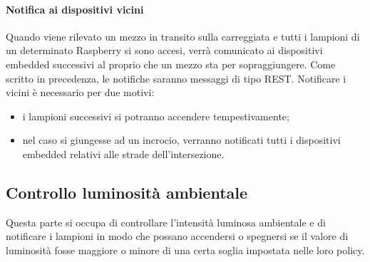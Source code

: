 \paragraph{Notifica ai dispositivi vicini}
Quando viene rilevato un mezzo in transito sulla carreggiata e tutti i lampioni di un determinato Raspberry si sono accesi, verrà comunicato ai dispositivi embedded successivi al proprio che un mezzo sta per sopraggiungere.
Come scritto in precedenza, le notifiche saranno messaggi di tipo REST.
Notificare i vicini è necessario per due motivi:
\begin{itemize}
	\item i lampioni successivi si potranno accendere tempestivamente;
	\item nel caso si giungesse ad un incrocio, verranno notificati tutti i dispositivi embedded relativi alle strade dell'intersezione.
\end{itemize}

\subsection{Controllo luminosità ambientale}
Questa parte si occupa di controllare l'intensità luminosa ambientale e di notificare i lampioni in modo che possano accendersi o spegnersi se il valore di luminosità fosse maggiore o minore di una certa soglia impostata nelle loro policy.
